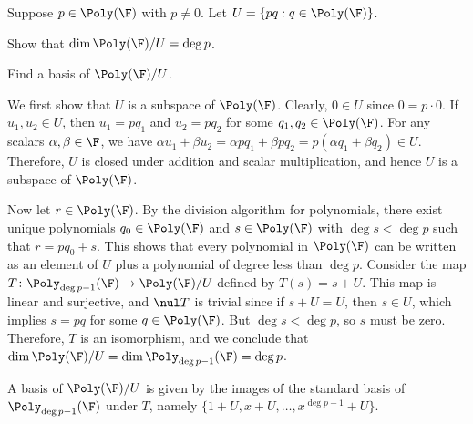 \begin{exc}
\begin{exercise}
Suppose $p\in\Poly(\F)$ with $p\ne0$. Let $U=\{pq : q\in\Poly(\F)\}$.
\begin{parts}
\item Show that $\dim\Poly(\F)/U=\deg p$.
\item Find a basis of $\Poly(\F)/U$.
\end{parts}
\end{exercise}
\begin{solution}\leavevmode
\begin{parts}
\item We first show that $U$ is a subspace of $\Poly(\F)$. Clearly, $0\in U$
  since $0=p\cdot0$. If $u_1,u_2\in U$, then $u_1=pq_1$ and $u_2=pq_2$ for some
  $q_1,q_2\in\Poly(\F)$. For any scalars $\alpha,\beta\in\F$, we have
  $\alpha u_1+\beta u_2=\alpha pq_1+\beta pq_2=p(\alpha q_1+\beta q_2)\in U$.
  Therefore, $U$ is closed under addition and scalar multiplication, and hence
  $U$ is a subspace of $\Poly(\F)$.

  Now let $r\in\Poly(\F)$. By the division algorithm for polynomials, there
  exist unique polynomials $q_0\in\Poly(\F)$ and $s\in\Poly(\F)$ with
  $\deg s<\deg p$ such that $r=pq_0+s$. This shows that every polynomial in
  $\Poly(\F)$ can be written as an element of $U$ plus a polynomial of degree
  less than $\deg p$. Consider the map
  $T\colon\Poly_{\deg p-1}(\F)\to\Poly(\F)/U$ defined by $T(s)=s+U$. This map
  is linear and surjective, and $\nul T$ is trivial since if $s+U=U$, then
  $s\in U$, which implies $s=pq$ for some $q\in\Poly(\F)$. But
  $\deg s<\deg p$, so $s$ must be zero. Therefore, $T$ is an isomorphism, and
  we conclude that $\dim\Poly(\F)/U=\dim\Poly_{\deg p-1}(\F)=\deg p$.
\item A basis of $\Poly(\F)/U$ is given by the images of the standard basis of
  $\Poly_{\deg p-1}(\F)$ under $T$, namely
  $\{1+U,x+U,\dots,x^{\deg p-1}+U\}$. \qedhere
\end{parts}
\end{solution}


\end{exc}
